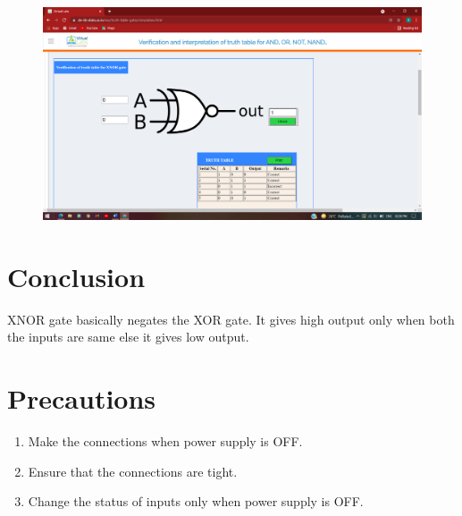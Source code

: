 		\begin{figure}[h]
		\centering
		\includegraphics[width=0.9\linewidth]{img/exp7/7}
		\caption{}
		\label{fig:7:7}
	\end{figure}

\section{Conclusion}
XNOR gate basically negates the XOR gate. It gives high output only when both the inputs are same else it gives low output.

\section{Precautions}
	\begin{enumerate}
		\tightlist
		\item Make the connections when power supply is OFF.
		\item Ensure that the connections are tight.
		\item Change the status of inputs only when power supply is OFF.
	\end{enumerate}